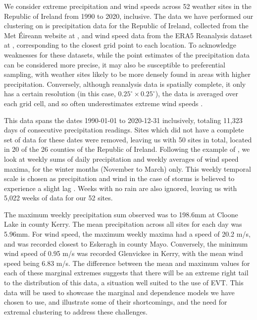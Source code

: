 \documentclass{article}
\numberwithin{equation}{section}
\begin{document}
We consider extreme precipitation and wind speeds across 52 weather sites in the Republic of Ireland from 1990 to 2020, inclusive.  
The data we have performed our clustering on is precipitation data for the Republic of Ireland, collected from the Met Éireann website at \citet{metHistoricalData}, and wind speed data from the ERA5 Reanalysis dataset at \citet{Hersbach2020}, corresponding to the closest grid point to each location.
To acknowledge weaknesses for these datasets, while the point estimates of the precipitation data can be considered more precise, it may also be susceptible to preferential sampling, with weather sites likely to be more densely found in areas with higher precipitation.
Conversely, although reanalysis data is spatially complete, it only has a certain resolution (in this case, $0.25^{\circ} \times 0.25^{\circ}$), the data is averaged over each grid cell, and so often underestimates extreme wind speeds \citep{Gandoin2024}.

This data spans the dates 1990-01-01 to 2020-12-31 inclusively, totaling 11,323 days of consecutive precipitation readings. 
Sites which did not have a complete set of data for these dates were removed, leaving us with 50 sites in total, located in 20 of the 26 counties of the Republic of Ireland. 
Following the example of \citet{Vignotto2021}, we look at weekly sums of daily precipitation and weekly averages of wind speed maxima, for the winter months (November to March) only.
This weekly temporal scale is chosen as precipitation and wind in the case of storms is believed to experience a slight lag \citep{Bengtsson2009}.
Weeks with no rain are also ignored, leaving us with 5,022 weeks of data for our 52 sites.

The maximum weekly precipitation sum observed was to 198.6mm at Cloone Lake in county Kerry. 
The mean precipitation across all sites for each day was 5.96mm.
For wind speed, the maximum weekly maxima had a speed of 20.2 m/s, and was recorded closest to Eskeragh in county Mayo.
Conversely, the minimum wind speed of 0.95 m/s was recorded Glenvickee in Kerry, with the mean wind speed being 6.83 m/s.
The difference between the mean and maximum values for each of these marginal extremes suggests that there will be an extreme right tail to the distribution of this data, a situation well suited to the use of EVT.
This data will be used to showcase the marginal and dependence models we have chosen to use, and illustrate some of their shortcomings, and the need for extremal clustering to address these challenges.
\end{document}
